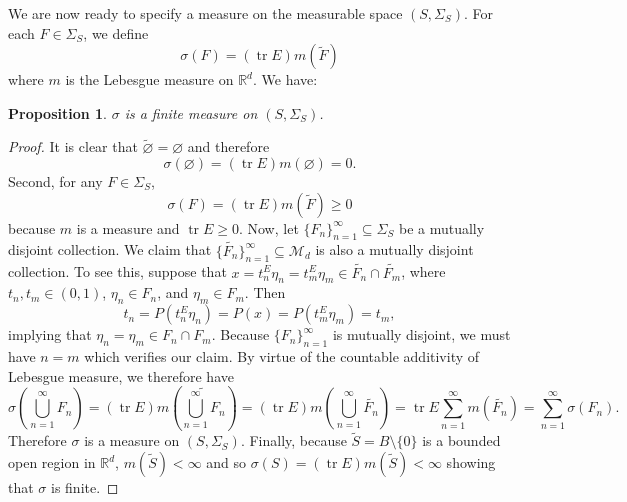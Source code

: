 \documentclass[11pt]{article}
\theoremstyle{theorem}
\newtheorem{proposition}[theorem]{Proposition}
\newcommand\tr{\operatorname{tr}}
\begin{document}
\noindent We are now ready to specify a measure on the measurable space $(S,\Sigma_S)$. For each $F\in \Sigma_S$, we define
\begin{equation*}
\sigma(F)=(\tr E) m(\widetilde F)
\end{equation*}
where $m$ is the Lebesgue measure on $\mathbb{R}^d$. We have:

\begin{proposition}\label{prop:sigmaisameaure}
$\sigma$ is a finite measure on $(S,\Sigma_S)$.
\end{proposition}
\begin{proof}

\noindent It is clear that $\widetilde{\varnothing}=\varnothing$ and therefore
\begin{equation*}
\sigma(\varnothing)=(\tr E)m(\varnothing)=0.
\end{equation*}
Second, for any $F \in \Sigma_S$, 
\begin{equation*}\sigma(F) = (\tr E) m(\tilde{F}) \geq 0
\end{equation*}
because $m$ is a measure and $\tr E\geq 0$. Now, let $\{ F_n  \}^\infty_{n=1} \subseteq \Sigma_S $ be a mutually disjoint collection. We claim that $\{ \widetilde{F_n} \}_{n=1}^\infty\subseteq\mathcal{M}_d$ is also a mutually disjoint collection. To see this, suppose that $x = t_n^E \eta_n = t_m^E \eta_m\in \widetilde{F_n}\cap\widetilde{F_m}$, where $t_n,t_m \in (0,1)$, $\eta_n \in F_n$, and $\eta_m \in F_m $. Then
\begin{equation*}
    t_n = P(t_n^E \eta_n) = P(x) = P(t_m^E \eta_m) = t_m,
\end{equation*}
implying that $\eta_n = \eta_m\in F_n\cap F_m$. Because $\{F_n\}_{n=1}^\infty$ is mutually disjoint, we must have $n=m$ which verifies our claim. By virtue of the countable additivity of Lebesgue measure, we therefore have
\begin{equation*}
\sigma\left(\bigcup_{n=1}^\infty F_n\right)
    = (\tr E)m\left( \widetilde{\bigcup^\infty_{n=1} F_n } \right)=(\tr E)m\left( \bigcup^\infty_{n=1}\widetilde{F_n} \right)
    = \tr E \sum^\infty_{n=1} m(\widetilde{F_n})
    = \sum^\infty_{n=1}\sigma(F_n).
\end{equation*}
Therefore $\sigma$ is a measure on $(S,\Sigma_S)$. Finally, because $\widetilde{S} = B\setminus\{ 0 \}$ is a bounded open region in $\mathbb{R}^d$, $m(\widetilde{S}) < \infty$ and so $\sigma(S) = (\tr E) m(\widetilde{S}) < \infty$ showing that $\sigma$ is finite.
\end{proof}
\end{document}
